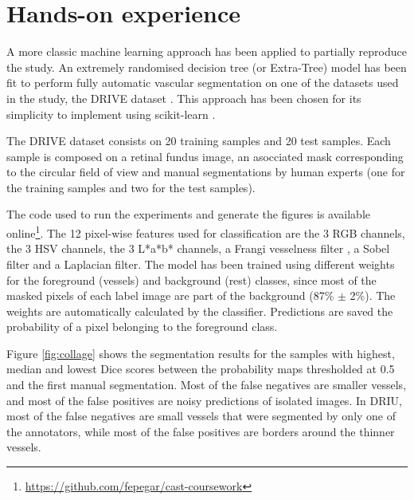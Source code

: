 \section{Hands-on experience}



A more classic machine learning approach has been applied to partially reproduce the study. An extremely randomised decision tree (or Extra-Tree) \cite{geurts_extremely_2006} model has been fit to perform fully automatic vascular segmentation on one of the datasets used in the study, the DRIVE dataset \cite{staal_ridge-based_2004}. This approach has been chosen for its simplicity to implement using scikit-learn \cite{pedregosa_scikit-learn:_2011}.



The DRIVE dataset consists on 20 training samples and 20 test samples. Each sample is composed on a retinal fundus image, an asocciated mask corresponding to the circular field of view and manual segmentations by human experts (one for the training samples and two for the test samples).

The code used to run the experiments and generate the figures is available online\footnote{\href{https://github.com/fepegar/cast-coursework}{https://github.com/fepegar/cast-coursework}}. The 12 pixel-wise features used for classification are the 3 RGB channels, the 3 HSV channels, the 3 L*a*b* channels, a Frangi vesselness filter \cite{frangi_multiscale_1998}, a Sobel filter and a Laplacian filter. The model has been trained using different weights for the foreground (vessels) and background (rest) classes, since most of the masked pixels of each label image are part of the background (87\% $\pm$ 2\%). The weights are automatically calculated by the classifier. Predictions are saved the probability of a pixel belonging to the foreground class.



Figure \ref{fig:collage} shows the segmentation results for the samples with highest, median and lowest Dice scores between the probability maps thresholded at 0.5 and the first manual segmentation. Most of the false negatives are smaller vessels, and most of the false positives are noisy predictions of isolated images. In DRIU, most of the false negatives are small vessels that were segmented by only one of the annotators, while most of the false positives are borders around the thinner vessels.

